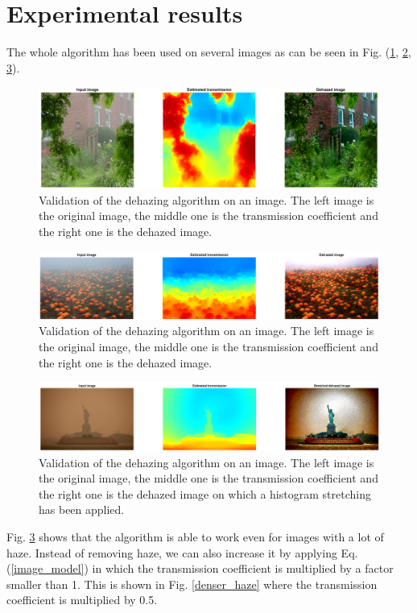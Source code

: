 \documentclass[conference]{IEEEtran}
\begin{document}
\section{Experimental results}
The whole algorithm has been used on several images as can be seen in Fig. (\ref{validation1}, \ref{validation2}, \ref{validation3}).
\begin{figure}
    \centering
    \includegraphics[width=\linewidth]{img/validation1.png}
    \caption{Validation of the dehazing algorithm on an image. The left image is the original image, the middle one is the transmission coefficient and the right one is the dehazed image.}
    \label{validation1}
\end{figure}
\begin{figure}
    \centering
    \includegraphics[width=\linewidth]{img/validation2.png}
    \caption{Validation of the dehazing algorithm on an image. The left image is the original image, the middle one is the transmission coefficient and the right one is the dehazed image.}
    \label{validation2}
\end{figure}
\begin{figure}
    \centering
    \includegraphics[width=\linewidth]{img/validation3.png}
    \caption{Validation of the dehazing algorithm on an image. The left image is the original image, the middle one is the transmission coefficient and the right one is the dehazed image on which a histogram stretching has been applied.}
    \label{validation3}
\end{figure}
Fig. \ref{validation3} shows that the algorithm is able to work even for images with a lot of haze. Instead of removing haze, we can also increase it by applying Eq. (\ref{image_model}) in which the transmission coefficient is multiplied by a factor smaller than 1. This is shown in Fig. \ref{denser_haze} where the transmission coefficient is multiplied by 0.5.
\end{document}
